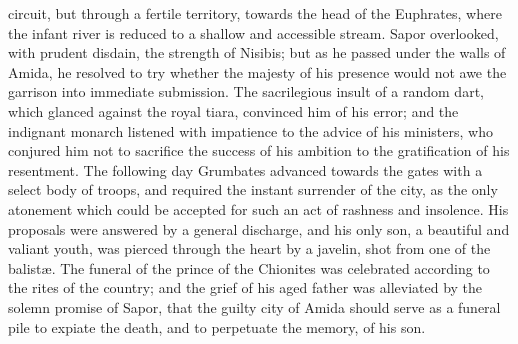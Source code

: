 circuit, but through a fertile territory, towards the head of the
Euphrates, where the infant river is reduced to a shallow and
accessible stream. Sapor overlooked, with prudent disdain, the
strength of Nisibis; but as he passed under the walls of Amida,
he resolved to try whether the majesty of his presence would not
awe the garrison into immediate submission. The sacrilegious
insult of a random dart, which glanced against the royal tiara,
convinced him of his error; and the indignant monarch listened
with impatience to the advice of his ministers, who conjured him
not to sacrifice the success of his ambition to the gratification
of his resentment. The following day Grumbates advanced towards
the gates with a select body of troops, and required the instant
surrender of the city, as the only atonement which could be
accepted for such an act of rashness and insolence. His proposals
were answered by a general discharge, and his only son, a
beautiful and valiant youth, was pierced through the heart by a
javelin, shot from one of the balistæ. The funeral of the prince
of the Chionites was celebrated according to the rites of the
country; and the grief of his aged father was alleviated by the
solemn promise of Sapor, that the guilty city of Amida should
serve as a funeral pile to expiate the death, and to perpetuate
the memory, of his son.



